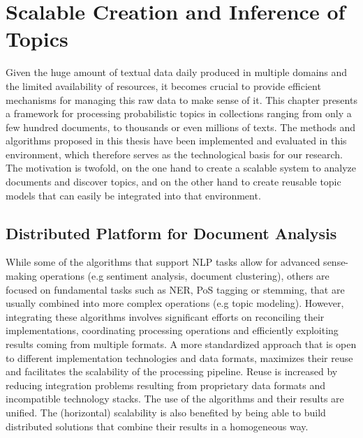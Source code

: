 

\chapter{Scalable Creation and Inference of Topics}\label{ch:scalability}

\graphicspath{{scalability/figures/}}


Given the huge amount of textual data daily produced in multiple domains and the limited availability of resources, it becomes crucial to provide efficient mechanisms for managing this raw data to make sense of it. This chapter presents a framework for processing probabilistic topics in collections ranging from only a few hundred documents, to thousands or even millions of texts. The methods and algorithms proposed in this thesis have been implemented and evaluated in this environment, which therefore serves as the technological basis for our research. The motivation is twofold, on the one hand to create a scalable system to analyze documents and discover topics, and on the other hand to create reusable topic models that can easily be integrated into that environment.


\section{Distributed Platform for Document Analysis}


While some of the algorithms that support NLP tasks allow for advanced sense-making operations (e.g sentiment analysis, document clustering), others are focused on fundamental tasks such as NER, PoS tagging or stemming, that are usually combined into more complex operations (e.g topic modeling). However, integrating these algorithms involves significant efforts on reconciling their implementations, coordinating processing operations and efficiently exploiting results coming from multiple formats. A more standardized approach that is open to different implementation technologies and data formats, maximizes their reuse and facilitates the scalability of the processing pipeline. Reuse is increased by reducing integration problems resulting from proprietary data formats and incompatible technology stacks. The use of the algorithms and their results are unified. The (horizontal) scalability is also benefited by being able to build distributed solutions that combine their results in a homogeneous way. 

